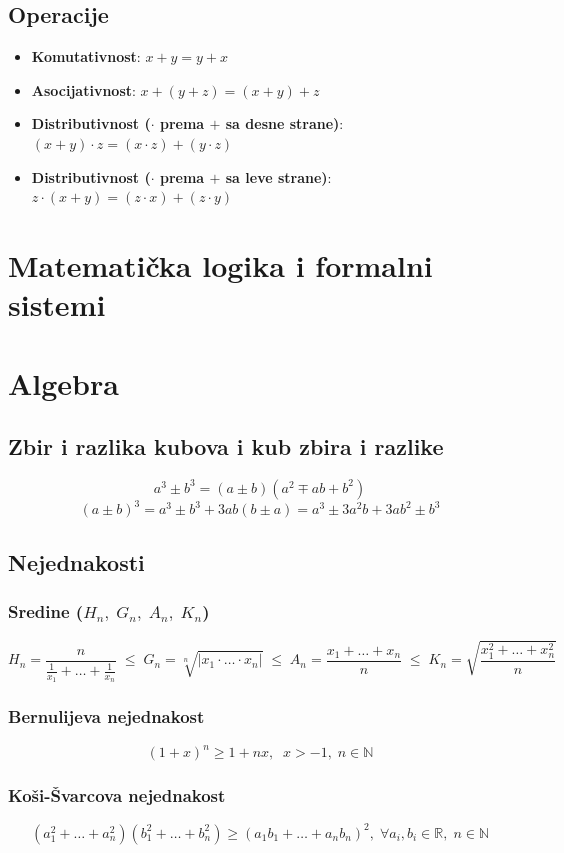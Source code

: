\documentclass[a4paper,12pt,twoside]{report}
\numberwithin{algorithm}{section}
\begin{document}
\section{Operacije}
\begin{itemize}
    \item \textbf{Komutativnost}: $x+y=y+x$
    \item \textbf{Asocijativnost}: $x+(y+z) = (x+y)+z$
    \item \textbf{Distributivnost ($\cdot$ prema $+$ sa desne strane)}: $(x+y)\cdot z = (x \cdot z) + (y \cdot z)$
    \item \textbf{Distributivnost ($\cdot$ prema $+$ sa leve strane)}: $z \cdot (x+y) = (z \cdot x) + (z \cdot y)$
\end{itemize}
\newpage


\newpage

\newpage

\chapter{Matematička logika i formalni sistemi}

\chapter{Algebra}
\section{Zbir i razlika kubova i kub zbira i razlike}
\[a^3\pm b^3 = (a \pm b)(a^2 \mp ab +b^2)\]
\[(a\pm b)^3 = a^3 \pm b^3 + 3ab(b \pm a) = a^3 \pm 3a^2b + 3ab^2 \pm b^3\]
\section{Nejednakosti}
\subsection{Sredine ($H_n,\; G_n,\; A_n,\; K_n$)}
\[H_n = \frac{n}{\frac{1}{x_1} + {\dots} + \frac{1}{x_n}} \;\leq\; G_n = \sqrt[n]{|x_1\cdot {\dots} \cdot x_n|} \;\leq\; A_n = \frac{x_1+{\dots} +x_n}{n} \;\leq\; K_n = \sqrt{\frac{x_1^2+{\dots} + x_n^2}{n}}\]
\subsection{Bernulijeva nejednakost}
\[(1+x)^n \geq 1 + nx, \;\;x>-1, \;n\in \mathbb{N}\]
\subsection{Koši-Švarcova nejednakost}
\[(a_1^2 + \dots + a_n^2)(b_1^2 + \dots + b_n^2) \geq (a_1b_1 + \dots + a_nb_n)^2, \;\forall a_i,b_i \in \mathbb{R}, \; n \in \mathbb{N}\]
\end{document}

